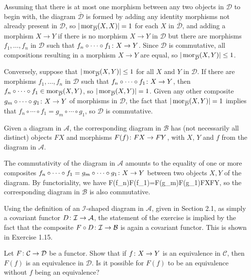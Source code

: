 \bs
\ben[label=(\alph*)]
\item Assuming that there is at most one morphism between any two objects in $\mathcal{D}$ to begin with, the diagram $\overline{\mathcal{D}}$ is formed by adding any identity morphisms not already present in $\mathcal{D}$, so $|\operatorname{mor}_{\overline{\mathcal{D}}}(X,X)|=1$ for each $X$ in $\overline{\mathcal{D}}$, and adding a morphism $X\to Y$ if there is no morphism $X\to Y$ in $\mathcal{D}$ but there are morphisms $f_1,\ldots,f_n$ in $\mathcal{D}$ such that $f_n\circ\cdots\circ f_1\colon X\to Y$. Since $\mathcal{D}$ is commutative, all compositions resulting in a morphism $X\to Y$ are equal, so $|\operatorname{mor}_{\overline{\mathcal{D}}}(X,Y)|\leq 1$.

Conversely, suppose that $|\operatorname{mor}_{\overline{\mathcal{D}}}(X,Y)|\leq 1$ for all $X$ and $Y$ in $\mathcal{D}$. If there are morphisms $f_1,\ldots,f_n$ in $\mathcal{D}$ such that $f_n\circ\cdots\circ f_1\colon X\to Y$, then $f_n\circ\cdots\circ f_1\in\operatorname{mor}_{\overline{\mathcal{D}}}(X,Y)$, so $|\operatorname{mor}_{\overline{\mathcal{D}}}(X,Y)|=1$. Given any other composite $g_m\circ\cdots\circ g_1\colon X\to Y$ of morphisms in $\mathcal{D}$, the fact that $|\operatorname{mor}_{\overline{\mathcal{D}}}(X,Y)|=1$ implies that $f_n\circ\cdots\circ f_1=g_m\circ\cdots\circ g_1$, so $\mathcal{D}$ is commutative.
\item Given a diagram in $\mathcal{A}$, the corresponding diagram in $\mathcal{B}$ has (not necessarily all distinct) objects $FX$ and morphisms $F(f)\colon FX\to FY$, with $X$, $Y$ and $f$ from the diagram in $\mathcal{A}$.

The commutativity of the diagram in $\mathcal{A}$ amounts to the equality of one or more composites $f_n\circ \cdots \circ f_1=g_m\circ \cdots \circ g_1\colon X\to Y$ between two objects $X,Y$ of the diagram. By functoriality, we have
\bse
F(f_n)\circ \cdots \circ F(f_1)=F(g_m)\circ \cdots \circ F(g_1)\cl FX\to FY,
\ese
so the corresponding diagram in $\mathcal{B}$ is also commutative.

Using the definition of an $\mathcal{I}$-shaped diagram in $\mathcal{A}$, given in Section 2.1, as simply a covariant functor $D\colon\mathcal{I}\to\mathcal{A}$, the statement of the exercise is implied by the fact that the composite $F\circ D\colon\mathcal{I}\to\mathcal{B}$ is again a covariant functor. This is shown in Exercise 1.15. 
\een
\es

\bp
Let $F \colon \mathcal{C} \to \mathcal{D}$ be a functor. Show that if $f \colon X \to Y$ is an equivalence in $\mathcal{C}$, then $F(f)$ is an equivalence in $\mathcal{D}$. Is it possible for $F(f)$ to be an equivalence without $f$ being an equivalence?
\ep

